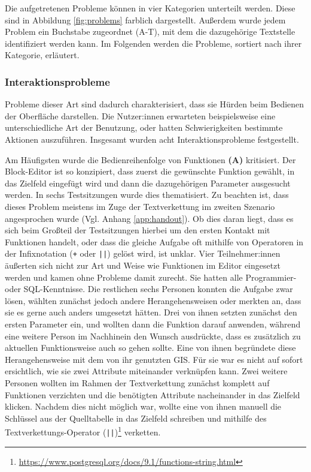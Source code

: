 Die aufgetretenen Probleme können in vier Kategorien unterteilt werden. Diese sind in Abbildung \ref{fig:problems} farblich dargestellt. Außerdem wurde jedem Problem ein Buchstabe zugeordnet (A-T), mit dem die dazugehörige Textstelle identifiziert werden kann. Im Folgenden werden die Probleme, sortiert nach ihrer Kategorie, erläutert.

\subsubsection{Interaktionsprobleme}

Probleme dieser Art sind dadurch charakterisiert, dass sie Hürden beim Bedienen der Oberfläche darstellen. Die Nutzer:innen erwarteten beispielsweise eine unterschiedliche Art der Benutzung, oder hatten Schwierigkeiten bestimmte Aktionen auszuführen. Insgesamt wurden acht Interaktionsprobleme festgestellt.

Am Häufigsten wurde die Bedienreihenfolge von Funktionen \textbf{(A)} kritisiert. Der Block-Editor ist so konzipiert, dass zuerst die gewünschte Funktion gewählt, in das Zielfeld eingefügt wird und dann die dazugehörigen Parameter ausgesucht werden. In sechs Testsitzungen wurde dies thematisiert. Zu beachten ist, dass dieses Problem meistens im Zuge der Textverkettung im zweiten Szenario angesprochen wurde (Vgl. Anhang \ref{app:handout}). Ob dies daran liegt, dass es sich beim Großteil der Testsitzungen hierbei um den ersten Kontakt mit Funktionen handelt, oder dass die gleiche Aufgabe oft mithilfe von Operatoren in der Infixnotation (\texttt{+} oder \texttt{||}) gelöst wird, ist unklar. Vier Teilnehmer:innen äußerten sich nicht zur Art und Weise wie Funktionen im Editor eingesetzt werden und kamen ohne Probleme damit zurecht. Sie hatten alle Programmier- oder \ac{SQL}-Kenntnisse. Die restlichen sechs Personen konnten die Aufgabe zwar lösen, wählten zunächst jedoch andere Herangehensweisen oder merkten an, dass sie es gerne auch anders umgesetzt hätten. Drei von ihnen setzten zunächst den ersten Parameter ein, und wollten dann die Funktion darauf anwenden, während eine weitere Person im Nachhinein den Wunsch ausdrückte, dass es zusätzlich zu aktuellen Funktionsweise auch so gehen sollte. Eine von ihnen begründete diese Herangehensweise mit dem von ihr genutzten \ac{GIS}. Für sie war es nicht auf sofort ersichtlich, wie sie zwei Attribute miteinander verknüpfen kann. Zwei weitere Personen wollten im Rahmen der Textverkettung zunächst komplett auf Funktionen verzichten und die benötigten Attribute nacheinander in das Zielfeld klicken. Nachdem dies nicht möglich war, wollte eine von ihnen manuell die Schlüssel aus der Quelltabelle in das Zielfeld schreiben und mithilfe des Textverkettungs-Operator (\texttt{||})\footnote{\url{https://www.postgresql.org/docs/9.1/functions-string.html}} verketten.

